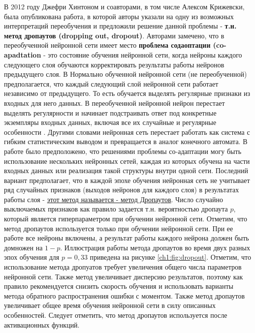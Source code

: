 \documentclass[12pt]{article}
\begin{document}
\begin{sloppypar}
В 2012 году Джефри Хинтоном и соавторами, в том числе Алексом Крижевски, была опубликована работа, в которой авторы указали на одну из возможных интерпретаций переобучения и предложили решение данной проблемы - \textbf{т.н. метод дропаутов (dropping out, dropout)}\cite{hinton2012improving}. Авторами замечено, что в переобученной нейронной сети имеет место \textbf{проблема содаоптации (co-apadtation}  - это состояние обучения нейронной сети, когда нейроны каждого следующего слоя обучаются корректировать результаты работы нейронов предыдущего слоя. В Нормально обученной нейронной сети (не переобученной) предполагается, что каждый следующий слой нейронной сети работает независимо от предыдущего. То есть обучается выделять регулярные признаки из входных для него данных.  В переобученной нейронной нейрон перестает выделять регулярности и начинает подстраивать ответ под конкретные экземпляры входных данных, включая все их случайные и регулярные особенности \cite{hinton2012improving}. Другими словами нейронная сеть перестает работать как система с гибким статистическим выводом и превращается в аналог конечного автомата. 
В работе \cite{hinton2012improving} было предположено, что решениями проблемы со-адаптации могу быть использование нескольких нейронных сетей, каждая из которых обучена на части входных данных или реализация такой структуры внутри одной сети. Последний вариант предполагает, что в каждой эпохе обучения нейронная сеть не учитывает ряд случайных признаков (выходов нейронов для каждого слоя) в результатах работы слоя - \uline{этот метод называется - метод Дропаутов}. Число случайно выключаемых признаков как правило задается т.н. вероятностью дропаута $p$, который является гиперпараметром при обучении нейронной сети. Отметим, что метод дропаутов используется только при обучении нейронной сети. При ее работе все нейроны включены, а результат работы каждого нейрона должен быть домножен на $1-p$. Иллюстрация работы метода дропаутов во время двух разных эпох обучения для $p=0,33$ приведена на рисунке \ref{ch1:fig:dropout}. Отметим, что использование метода дропуатов требует увеличения общего числа параметров нейронной сети. Также метод увеличивает дисперсию результатов, поэтому как правило рекомендуется снизить скорость обучения и использовать варианты метода обратного распространения ошибки с моментом. Также метод дропаутов увеличивает общее время обучения нейронной сети в силу описанных особенностей. Следует отметить, что метод дропаутов используется после активационных функций. 

\end{sloppypar}
\end{document}
